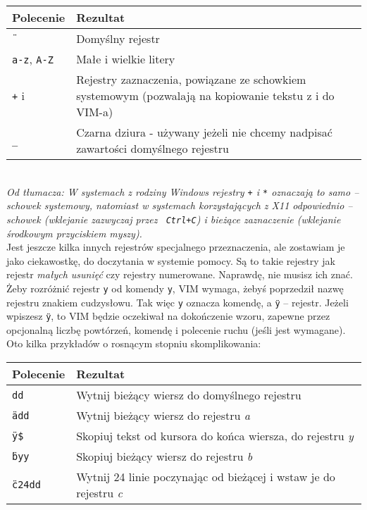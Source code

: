 \documentclass[a4paper,12pt]{article}
\begin{document}
\begin{tabular}{ l | p{} }
{\bf Polecenie} & {\bf Rezultat} \\ \hline
{\tt \"{}} & Domyślny rejestr \\
{\tt a-z}, {\tt A-Z} & Małe i wielkie litery \\
{\tt +} i {\tt *} & Rejestry zaznaczenia, powiązane ze schowkiem systemowym (pozwalają na kopiowanie tekstu z i do VIM-a) \\
{\tt \_} & Czarna dziura - używany jeżeli nie chcemy nadpisać zawartości domyślnego rejestru \\ \hline
\end{tabular}\\

\noindent
{\it Od tłumacza: W systemach z rodziny Windows rejestry \textit{\texttt{+}} i \textit{\texttt{*}} oznaczają to samo – schowek systemowy, natomiast w systemach korzystających z X11 odpowiednio – schowek (wklejanie zazwyczaj przez \textit{\texttt{ Ctrl+C}}) i bieżące zaznaczenie (wklejanie środkowym przyciskiem myszy).} \\
Jest jeszcze kilka innych rejestrów specjalnego przeznaczenia, ale zostawiam je jako ciekawostkę, do doczytania w systemie pomocy. Są to takie rejestry jak rejestr {\it małych usunięć} czy rejestry numerowane. Naprawdę, nie musisz ich znać.\\
Żeby rozróżnić rejestr {\tt y} od komendy {\tt y}, VIM wymaga, żebyś poprzedził nazwę rejestru znakiem cudzysłowu. Tak więc {\tt y} oznacza komendę, a {\tt \"{}y} – rejestr. Jeżeli wpiszesz {\tt \"{}y}, to VIM będzie oczekiwał na dokończenie wzoru, zapewne przez opcjonalną liczbę powtórzeń, komendę i polecenie ruchu (jeśli jest wymagane). Oto kilka przykładów o rosnącym stopniu skomplikowania:

\begin{tabular}{ l | p{} }
{\bf Polecenie} & {\bf Rezultat} \\ \hline
{\tt dd} & Wytnij bieżący wiersz do domyślnego rejestru \\
{\tt \"{}add} & Wytnij bieżący wiersz do rejestru {\it a} \\
{\tt \"{}y\$} &	Skopiuj tekst od kursora do końca wiersza, do rejestru {\it y} \\
{\tt \"{}byy} & Skopiuj bieżący wiersz do rejestru {\it b} \\
{\tt \"{}c24dd} & Wytnij 24 linie poczynając od bieżącej i wstaw je do rejestru {\it c} \\ \hline
\end{tabular}\\
\end{document}
